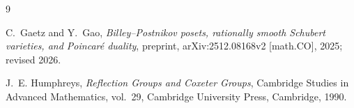 \documentclass[11pt]{amsart}
\begin{document}
\begin{thebibliography}{9}

C.~Gaetz and Y.~Gao,
\emph{Billey--Postnikov posets, rationally smooth Schubert varieties,
and Poincar\'e duality},
preprint, arXiv:2512.08168v2 [math.CO], 2025; revised 2026.

J.~E. Humphreys,
\emph{Reflection Groups and Coxeter Groups},
Cambridge Studies in Advanced Mathematics, vol.~29,
Cambridge University Press, Cambridge, 1990.

\end{thebibliography}
\end{document}

